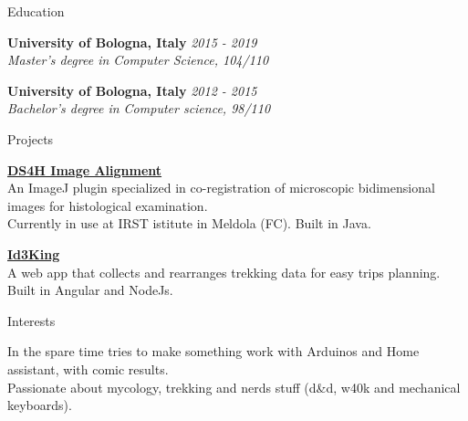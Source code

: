 \documentclass{../resume} %
\begin{document}
\begin{rSection}{Education}

{\bf University of Bologna, Italy } \hfill {\em 2015 - 2019} 
\\{ \textit {Master's degree in Computer Science, 104/110 }} 

{\bf University of Bologna, Italy } \hfill {\em 2012 - 2015} 
\\ { \textit {Bachelor's degree in Computer science, 98/110 }} \hfill


\end{rSection}


\begin{rSection}{Projects}

{\bf \href{https://imagej.net/plugins/ds4h-image-alignment}{DS4H Image Alignment}}
\\ An ImageJ plugin specialized in co-registration of microscopic bidimensional images for histological examination.\\
Currently in use at IRST istitute in Meldola (FC). Built in Java.

{\bf \href{https://github.com/illeb/id3king}{Id3King}}
\\ A web app that collects and rearranges trekking data for easy trips planning.\\
Built in Angular and NodeJs.

\end{rSection}


\begin{rSection}{Interests}

  In the spare time tries to make something work with Arduinos and Home assistant, with comic results. \\Passionate about mycology, trekking and nerds stuff (d\&d, w40k and mechanical
 keyboards).
\end{rSection}
\end{document}
